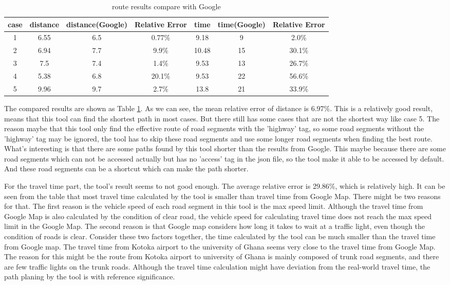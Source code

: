 \documentclass[final-report]{report-template}
\begin{document}
\begin{table}[H]
    \centering
    \begin{tabular}{|c|c|c|c|c|c|c|}
    \hline
   case & distance & distance(Google) & Relative Error & time & time(Google) & Relative Error\\
    \hline
    1 & 6.55 & 6.5 & 0.77\% & 9.18 & 9 & 2.0\% \\
    2 & 6.94 & 7.7 & 9.9\% & 10.48 & 15 & 30.1\% \\
    3 & 7.5 & 7.4 & 1.4\% & 9.53 & 13 & 26.7\% \\
    4 & 5.38 & 6.8 & 20.1\% & 9.53 & 22 & 56.6\% \\
    5 & 9.96 & 9.7 & 2.7\% & 13.8 & 21 & 33.9\% \\
    \hline
    \end{tabular}
    \caption{\label{tab:route_results}route results compare with Google}
\end{table}
The compared results are shown as Table \ref{tab:route_results}. 
As we can see, the mean relative error of distance is 6.97\%. 
This is a relatively good result, means that this tool can find the shortest path in most cases.
But there still has some cases that are not the shortest way like case 5.
The reason maybe that this tool only find the effective route of road segments with the 'highway' tag,
so some road segments without the 'highway' tag may be ignored,
the tool has to skip these road segments and use some longer road segments when finding the best route.
What's interesting is that there are some paths found by this tool shorter than the results from Google.
This maybe because there are some road segments which can not be accessed actually but has no 'access' tag in the json file, 
so the tool make it able to be accessed by default. And these road segments can be a shortcut which can make the path shorter.

For the travel time part, the tool's result seems to not good enough.
The average relative error is 29.86\%, which is relatively high. 
It can be seen from the table that most travel time calculated by the tool is smaller than travel time from Google Map.
There might be two reasons for that. 
The first reason is the vehicle speed of each road segment in this tool is the max speed limit. 
Although the travel time from Google Map is also calculated by the condition of clear road, 
the vehicle speed for calculating travel time does not reach the max speed limit in the Google Map.
The second reason is that Google map considers how long it takes to wait at a traffic light, 
even though the condition of roads is clear.
Consider these two factors together, the time calculated by the tool can be much smaller than the travel time from Google map.
The travel time from Kotoka airport to the university of Ghana seems very close to the travel time from Google Map. 
The reason for this might be the route from Kotoka airport to university of Ghana is mainly composed of trunk road segments,
and there are few traffic lights on the trunk roads.
Although the travel time calculation might have deviation from the real-world travel time, 
the path planing by the tool is with reference significance.
\end{document}
